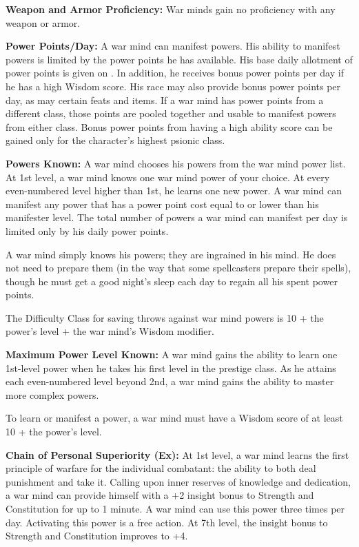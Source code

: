 {
\textbf{Weapon and Armor Proficiency:} War minds gain no proficiency with any weapon or armor.

\textbf{Power Points/Day:} A war mind can manifest powers. His ability to manifest powers is limited by the power points he has available. His base daily allotment of power points is given on . In addition, he receives bonus power points per day if he has a high Wisdom score. His race may also provide bonus power points per day, as may certain feats and items. If a war mind has power points from a different class, those points are pooled together and usable to manifest powers from either class. Bonus power points from having a high ability score can be gained only for the character's highest psionic class.

\textbf{Powers Known:} A war mind chooses his powers from the war mind power list. At 1st level, a war mind knows one war mind power of your choice. At every even-numbered level higher than 1st, he learns one new power. A war mind can manifest any power that has a power point cost equal to or lower than his manifester level. The total number of powers a war mind can manifest per day is limited only by his daily power points.

A war mind simply knows his powers; they are ingrained in his mind. He does not need to prepare them (in the way that some spellcasters prepare their spells), though he must get a good night's sleep each day to regain all his spent power points.

The Difficulty Class for saving throws against war mind powers is 10 + the power's level + the war mind's Wisdom modifier.

\textbf{Maximum Power Level Known:} A war mind gains the ability to learn one 1st-level power when he takes his first level in the prestige class. As he attains each even-numbered level beyond 2nd, a war mind gains the ability to master more complex powers.

To learn or manifest a power, a war mind must have a Wisdom score of at least 10 + the power's level.

\textbf{Chain of Personal Superiority (Ex):} At 1st level, a war mind learns the first principle of warfare for the individual combatant: the ability to both deal punishment and take it. Calling upon inner reserves of knowledge and dedication, a war mind can provide himself with a +2 insight bonus to Strength and Constitution for up to 1 minute. A war mind can use this power three times per day. Activating this power is a free action. At 7th level, the insight bonus to Strength and Constitution improves to +4.

}
